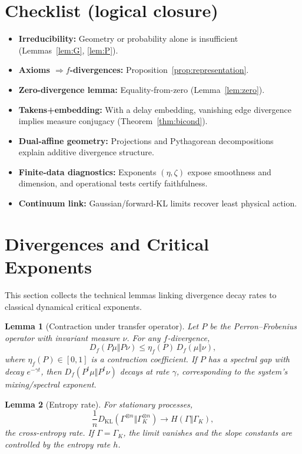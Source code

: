\documentclass[11pt]{article}
\newtheorem{lemma}{Lemma}
\newcommand{\1}{\mathbf{1}}
\begin{document}
\section{Checklist (logical closure)}
\begin{itemize}[leftmargin=2em,itemsep=2pt,topsep=2pt]
  \item \textbf{Irreducibility:} Geometry or probability alone is insufficient (Lemmas~\ref{lem:G}, \ref{lem:P}).
  \item \textbf{Axioms $\Rightarrow f$-divergences:} Proposition~\ref{prop:representation}.
  \item \textbf{Zero-divergence lemma:} Equality-from-zero (Lemma~\ref{lem:zero}).
  \item \textbf{Takens+embedding:} With a delay embedding, vanishing edge divergence implies measure conjugacy (Theorem~\ref{thm:bicond}).
  \item \textbf{Dual-affine geometry:} Projections and Pythagorean decompositions explain additive divergence structure.
  \item \textbf{Finite-data diagnostics:} Exponents $(\eta,\zeta)$ expose smoothness and dimension, and operational tests certify faithfulness.
  \item \textbf{Continuum link:} Gaussian/forward-KL limits recover least physical action.
\end{itemize}


\nocite{*}


\appendix

\section{Divergences and Critical Exponents}
\label{app:exponents}

This section collects the technical lemmas linking divergence decay rates to classical
dynamical critical exponents.

\begin{lemma}[Contraction under transfer operator]
Let $P$ be the Perron–Frobenius operator with invariant measure $\nu$. For any $f$-divergence,
\[
D_f(P\mu \Vert P\nu) \le \eta_f(P)\, D_f(\mu \Vert \nu),
\]
where $\eta_f(P)\in[0,1]$ is a contraction coefficient. If $P$ has a spectral gap with decay $e^{-\gamma t}$, then $D_f(P^t\mu\Vert P^t\nu)$ decays at rate $\gamma$, corresponding to the system's mixing/spectral exponent.
\end{lemma}

\begin{lemma}[Entropy rate]
For stationary processes,
\[
\frac{1}{n} D_{\mathrm{KL}}(\Gamma^{\otimes n}\Vert \Gamma_K^{\otimes n}) \to H(\Gamma \Vert \Gamma_K),
\]
the cross-entropy rate. If $\Gamma=\Gamma_K$, the limit vanishes and the slope constants are controlled by the entropy rate $h$.
\end{lemma}
\end{document}
